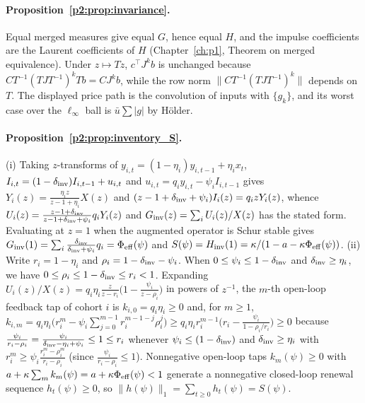 \paragraph{Proposition~\ref{p2:prop:invariance}.} Equal merged measures give equal $G$, hence equal $H$, and the impulse coefficients are the Laurent coefficients of $H$ (Chapter~\ref{ch:p1}, Theorem on merged equivalence). Under $z\mapsto Tz$, $c^\top J^kb$ is unchanged because $CT^{-1}(TJT^{-1})^kTb=CJ^kb$, while the row norm $\|CT^{-1}(TJT^{-1})^k\|$ depends on $T$. The displayed price path is the convolution of inputs with $\{g_k\}$, and its worst case over the $\ell_\infty$ ball is $\bar u\sum|g|$ by H\"older.

\paragraph{Proposition~\ref{p2:prop:inventory_S}.} (i) Taking $z$-transforms of $y_{i,t}=(1-\eta_i)y_{i,t-1}+\eta_i x_t$, $I_{i,t}=(1-\delta_{\rm inv})I_{i,t-1}+u_{i,t}$ and $u_{i,t}=q_i y_{i,t}-\psi_i I_{i,t-1}$ gives $Y_i(z)=\frac{\eta_i z}{z-1+\eta_i}X(z)$ and $(z-1+\delta_{\rm inv}+\psi_i)I_i(z)=q_i z Y_i(z)$, whence $U_i(z)=\frac{z-1+\delta_{\rm inv}}{z-1+\delta_{\rm inv}+\psi_i}q_i Y_i(z)$ and $G_{\rm inv}(z)=\sum_i U_i(z)/X(z)$ has the stated form. Evaluating at $z=1$ when the augmented operator is Schur stable gives $G_{\rm inv}(1)=\sum_i \frac{\delta_{\rm inv}}{\delta_{\rm inv}+\psi_i}q_i=\Phi_{\rm eff}(\psi)$ and $S(\psi)=H_{\rm inv}(1)=\kappa/(1-a-\kappa\Phi_{\rm eff}(\psi))$. (ii) Write $r_i=1-\eta_i$ and $\rho_i=1-\delta_{\rm inv}-\psi_i$. When $0\le\psi_i\le 1-\delta_{\rm inv}$ and $\delta_{\rm inv}\ge\eta_i$, we have $0\le\rho_i\le 1-\delta_{\rm inv}\le r_i<1$. Expanding $U_i(z)/X(z)=q_i\eta_i\frac{z}{z-r_i}\bigl(1-\frac{\psi_i}{z-\rho_i}\bigr)$ in powers of $z^{-1}$, the $m$-th open-loop feedback tap of cohort $i$ is $k_{i,0}=q_i\eta_i\ge0$ and, for $m\ge1$, $k_{i,m}=q_i\eta_i\bigl(r_i^m-\psi_i\sum_{j=0}^{m-1}r_i^{m-1-j}\rho_i^j\bigr)\ge q_i\eta_i r_i^{m-1}\bigl(r_i-\frac{\psi_i}{1-\rho_i/r_i}\bigr)\ge0$ because $\frac{\psi_i}{r_i-\rho_i}=\frac{\psi_i}{\delta_{\rm inv}-\eta_i+\psi_i}\le1\le r_i$ whenever $\psi_i\le(1-\delta_{\rm inv})$ and $\delta_{\rm inv}\ge\eta_i$ with $r_i^m\ge\psi_i\frac{r_i^m-\rho_i^m}{r_i-\rho_i}$ (since $\frac{\psi_i}{r_i-\rho_i}\le1$). Nonnegative open-loop taps $k_m(\psi)\ge0$ with $a+\kappa\sum_m k_m(\psi)=a+\kappa\Phi_{\rm eff}(\psi)<1$ generate a nonnegative closed-loop renewal sequence $h_t(\psi)\ge0$, so $\|h(\psi)\|_1=\sum_{t\ge0}h_t(\psi)=S(\psi)$.

